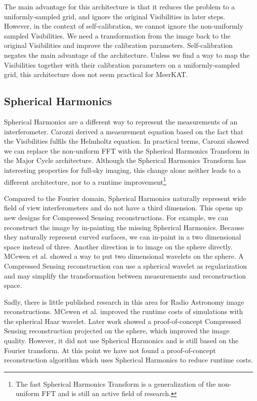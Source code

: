 The main advantage for this architecture is that it reduces the problem to a uniformly-sampled grid, and ignore the original Visibilities in later steps. However, in the context of self-calibration, we cannot ignore the non-uniformly sampled Visibilities. We need a transformation from the image back to the original Visibilities and improve the calibration parameters. Self-calibration negates the main advantage of the architecture. Unless we find a way to map the Visibilities together with their calibration parameters on a uniformly-sampled grid, this architecture does not seem practical for MeerKAT.


\subsection{Spherical Harmonics}
Spherical Harmonics are a different way to represent the measurements of an interferometer. Carozzi\cite{carozzi2015imaging} derived a measurement equation based on the fact that the Visibilities fulfils the Helmholtz equation. In practical terms, Carozzi showed we can replace the non-uniform FFT with the Spherical Harmonics Transform in the Major Cycle architecture. Although the Spherical Harmonics Transform has interesting properties for full-sky imaging, this change alone neither leads to a different architecture, nor to a runtime improvement\footnote{The fast Spherical Harmonics Transform is a generalization of the non-uniform FFT\cite{kunisnonequispaced} and is still an active field of research\cite{schaeffer2013efficient}.}

Compared to the Fourier domain, Spherical Harmonics naturally represent wide field of view interferometers and do not have a third dimension. This opens up new designs for Compressed Sensing reconstructions. For example, we can reconstruct the image by in-painting the missing Spherical Harmonics. Because they naturally represent curved surfaces, we can in-paint in a two dimensional space instead of three. Another direction is to image on the sphere directly. MCewen et al.\cite{mcewen2008simulating} showed a way to put two dimensional wavelets on the sphere. A Compressed Sensing reconstruction can use a spherical wavelet as regularization and may simplify the transformation between measurements and reconstruction space.

Sadly, there is little published research in this area for Radio Astronomy image reconstructions. MCewen et al.\cite{mcewen2008simulating} improved the runtime costs of simulations with the spherical Haar wavelet. Later work\cite{mcewen2011compressed} showed a proof-of-concept Compressed Sensing reconstruction projected on the sphere, which improved the image quality. However, it did not use Spherical Harmonics and \cite{mcewen2011compressed} is still based on the Fourier transform. At this point we have not found a proof-of-concept reconstruction algorithm which uses Spherical Harmonics to reduce runtime costs. 

